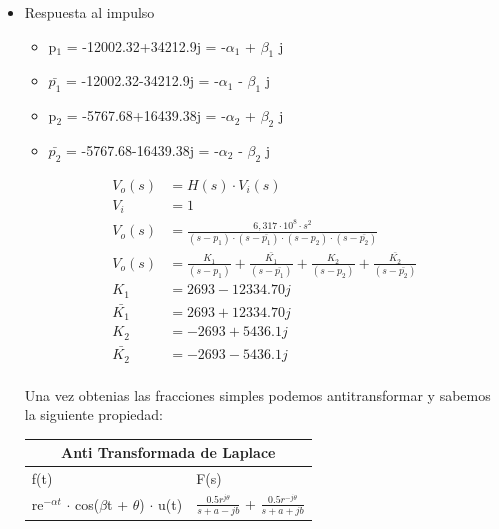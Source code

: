 \documentclass[11pt]{diazessay} %
\begin{document}
\begin{itemize}
\item Respuesta al impulso\\

\begin{itemize}
	\item p$_{1}$ = -12002.32+34212.9j = -$\alpha_{1}$ + $\beta_{1}$ j\\
	\item $\bar{p_{1}}$ = -12002.32-34212.9j = -$\alpha_{1}$ - $\beta_{1}$ j\\
	\item p$_{2}$ = -5767.68+16439.38j = -$\alpha_{2}$ + $\beta_{2}$ j\\
	\item $\bar{p_{2}}$ = -5767.68-16439.38j = -$\alpha_{2}$ - $\beta_{2}$ j\\
\end{itemize}

\begin{align*}
V_{o}(s) &= H(s) \cdot V_{i}(s)\\[10pt]
V_{i} &= 1 \\[10pt]
V_{o}(s) &= \frac{6,317 \cdot 10^8 \cdot s^2}{(s - p_{1}) \cdot (s - \bar{p_{1}}) \cdot (s - p_{2}) \cdot (s - \bar{p_{2}})} \\[10pt]
V_{o}(s) &= \frac{K_{1}}{(s - p_{1})} + \frac{\bar{K_{1}}}{(s - \bar{p_{1}})} +  \frac{K_{2}}{(s - p_{2})} + \frac{\bar{K_{2}}}{(s - \bar{p_{2}})} \\[10pt]
K_{1} &= 2693 - 12334.70 j \\[10pt]
\bar{K_{1}} &= 2693 + 12334.70 j \\[10pt]
K_{2} &= -2693 + 5436.1 j \\[10pt]
\bar{K_{2}} &= -2693 - 5436.1 j \\[10pt]
\end{align*}

Una vez obtenias las fracciones simples podemos antitransformar y sabemos la siguiente propiedad: \\
\begin{tabular}{ |p{6cm}|p{6cm}|  }
 \hline
 \multicolumn{2}{|c|}{Anti Transformada de Laplace} \\
 \hline
 f(t)& F(s)\\
 \hline
 re$^{- \alpha t}$ $\cdot$ cos($\beta$t + $\theta$) $\cdot$ u(t)  & $\frac{0.5 r ^{j \theta}}{s + a -jb}$ + $\frac{0.5 r ^{-j \theta}}{s + a + jb}$ \\
 \hline
\end{tabular}\\


\end{itemize}
\end{document}
